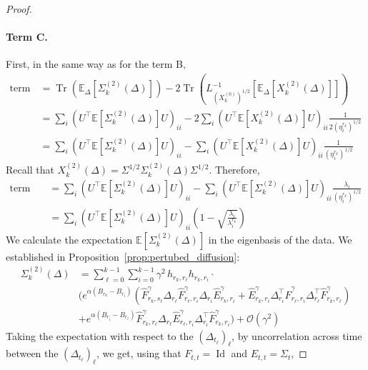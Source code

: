 \documentclass[11pt]{article}
\newcommand{\tr}[1]{\operatorname{Tr}\left({#1}\right)}
\newcommand{\id}{\operatorname{Id}}
\newcommand{\EE}{\mathbb{E}}
\begin{document}
\begin{proof}
\paragraph{Term C.} First, in the same way as for the term B,
\begin{align*}
   \text{term C} &=   \tr{ \EE_{\Delta}[\Sigma^{(2)}_{k}(\Delta)]} - 2 \tr{L_{\left(X^{(0)}_{k}\right)^{1/2}}^{-1}\left[\EE_{\Delta}[X^{(2)}_{k}(\Delta)]\right]} \\
   &= \sum_i \left( U^\top \EE \left[ \Sigma^{(2)}_{k}(\Delta) \right] U \right)_{ii}  - 2 \sum_i \left( U^\top \EE \left[ X^{(2)}_{k}(\Delta) \right] U \right)_{ii} \frac{1}{2 (\eta^{r_k}_i)^{1/2}} \\
    &= \sum_i \left( U^\top \EE \left[ \Sigma^{(2)}_{k}(\Delta) \right] U \right)_{ii}  - \sum_i \left( U^\top \EE \left[ X^{(2)}_{k}(\Delta) \right] U \right)_{ii} \frac{1}{ (\eta^{r_k}_i)^{1/2}} 
\end{align*}
Recall that $X^{(2)}_{k}(\Delta) = {\Sigma}^{1/2}\Sigma^{(2)}_{k}(\Delta) {\Sigma}^{1/2}$. Therefore, 
\begin{align*}
   \text{term C} &=  
     \sum_i \left( U^\top \EE \left[ \Sigma^{(2)}_{k}(\Delta) \right] U \right)_{ii}  - \sum_i \left( U^\top \EE \left[ \Sigma^{(2)}_{k}(\Delta) \right] U \right)_{ii} \frac{\lambda_i}{ (\eta^{r_k}_i)^{1/2}} \\
     &=  \sum_i \left( U^\top \EE \left[ \Sigma^{(2)}_{k}(\Delta) \right] U \right)_{ii}\left( 1 - \sqrt{\frac{\lambda_i}{\lambda^{r_k}_i }} \right)
\end{align*}
We calculate the expectation $\EE \left[ \Sigma^{(2)}_{k}(\Delta) \right]$ in the eigenbasis of the data. We established in  Proposition~\ref{prop:pertubed_diffusion}:   
\begin{align*}
\Sigma_{k}^{(2)}(\Delta) &=  \sum_{\ell=0}^{k-1} \sum_{i=0}^{k-1} \gamma^2 \,
 h_{r_k,r_{\ell}} h_{r_k,r_{i}} \cdot \\ \nonumber
 &\Biggl( e^{\alpha(B_{r_k}- B_{r_i})} \left(\hat F^\gamma_{r_k,s_{\ell}} \Delta_{r_\ell} \hat F^\gamma_{r_\ell,r_i} \Delta_{r_i} \hat E^\gamma_{r_k,r_i}
 + \hat E^\gamma_{r_k,r_i} \Delta_{r_i}^\top \hat F^\gamma_{r_\ell,r_i} \Delta_{r_\ell}^\top \hat F^\gamma_{r_k,r_\ell} \right)  \\ \nonumber  &+  e^{\alpha(B_{r_i}- B_{r_\ell})} \hat F^\gamma_{r_k,r_\ell} \Delta_{r_\ell} \hat E^\gamma_{r_\ell, r_i} \Delta_{r_i}^\top \hat F^\gamma_{r_k,r_i} \Biggl) + \mathcal{O}(\gamma^2)
 \end{align*}
Taking the expectation with respect to the $(\Delta_{t_\ell})_{\ell}$, by uncorrelation across time between the  $(\Delta_{t_\ell})_{\ell}$, we get, using that $F_{t,t} = \id$ and $E_{t,t} = \Sigma_t$,

\end{proof}
\end{document}
